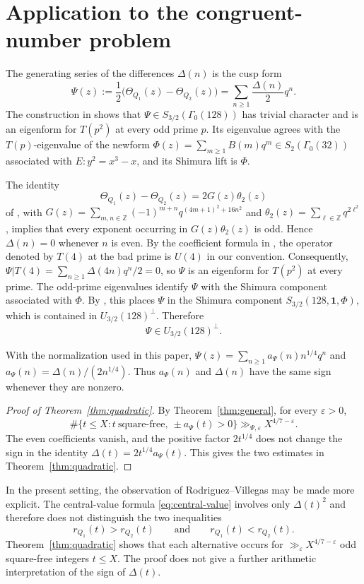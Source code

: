 \documentclass[10pt,a4paper]{amsart}
\newcommand{\Z}{\mathbb Z}
\begin{document}
\section{Application to the congruent-number problem}\label{sec:application}

The generating series of the differences $\Delta(n)$ is the cusp form
\[
\Psi(z):=\frac12\bigl(\Theta_{Q_1}(z)-\Theta_{Q_2}(z)\bigr)
       =\sum_{n\geq1}\frac{\Delta(n)}2q^n.
\]
The construction in \cite[Section~3]{Qin} shows that
$\Psi\in S_{3/2}(\Gamma_0(128))$ has trivial character and is an
eigenform for $T(p^2)$ at every odd prime $p$. Its eigenvalue agrees with
the $T(p)$-eigenvalue of the newform
$\Phi(z)=\sum_{m\geq1}B(m)q^m\in S_2(\Gamma_0(32))$ associated with
$E:y^2=x^3-x$, and its Shimura lift is $\Phi$.

The identity
\[
\Theta_{Q_1}(z)-\Theta_{Q_2}(z)=2G(z)\theta_2(z)
\]
of \cite[Lemma~3.4]{Qin}, with
$G(z)=\sum_{m,n\in\Z}(-1)^{m+n}q^{(4m+1)^2+16n^2}$ and
$\theta_2(z)=\sum_{\ell\in\Z}q^{2\ell^2}$, implies that every exponent
occurring in $G(z)\theta_2(z)$ is odd. Hence $\Delta(n)=0$ whenever $n$
is even. By the coefficient formula in \cite[Theorem~2.1]{PurkaitHecke}, the
operator denoted by $T(4)$ at the bad prime is $U(4)$ in our convention.
Consequently,
$\Psi|T(4)=\sum_{n\geq1}\Delta(4n)q^n/2=0$, so $\Psi$ is an eigenform
for $T(p^2)$ at every prime. The odd-prime eigenvalues identify $\Psi$
with the Shimura component associated with $\Phi$. By
\cite[Corollary~5.2]{PurkaitDecomposition}, this places \(\Psi\) in
the Shimura component \(S_{3/2}(128,\mathbf 1,\Phi)\), which is
contained in \(U_{3/2}(128)^\perp\). Therefore
\[
\Psi\in U_{3/2}(128)^\perp.
\]

With the normalization used in this paper,
$\Psi(z)=\sum_{n\geq1}a_\Psi(n)n^{1/4}q^n$ and
$a_\Psi(n)=\Delta(n)/(2n^{1/4})$. Thus $a_\Psi(n)$ and $\Delta(n)$ have
the same sign whenever they are nonzero.

\begin{proof}[Proof of Theorem~\ref{thm:quadratic}]
By Theorem~\ref{thm:general}, for every $\varepsilon>0$,
\[
\#\{t\leq X:t\ \mathrm{square\text{-}free},\ \pm a_\Psi(t)>0\}
\gg_{\Psi,\varepsilon}X^{4/7-\varepsilon}.
\]
The even coefficients vanish, and the positive factor $2t^{1/4}$ does
not change the sign in the identity $\Delta(t)=2t^{1/4}a_\Psi(t)$. This
gives the two estimates in Theorem~\ref{thm:quadratic}.
\end{proof}

In the present setting, the observation of Rodriguez--Villegas \cite{RodriguezVillegas} may be
made more explicit.  The central-value formula
\eqref{eq:central-value} involves only $\Delta(t)^2$ and therefore does
not distinguish the two inequalities
\[
r_{Q_1}(t)>r_{Q_2}(t)
\qquad\text{and}\qquad
r_{Q_1}(t)<r_{Q_2}(t).
\]
Theorem~\ref{thm:quadratic} shows that each alternative occurs for
$\gg_\varepsilon X^{4/7-\varepsilon}$ odd square-free integers
$t\leq X$.  The proof does not give a further arithmetic interpretation
of the sign of $\Delta(t)$.
\end{document}
